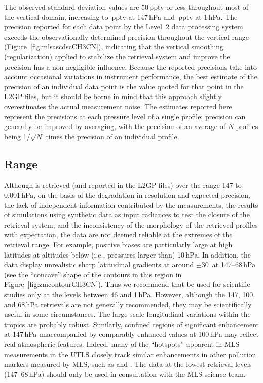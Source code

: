 The observed standard deviation values are 50\,pptv or less throughout most of the vertical domain, increasing to \,pptv at 147\,hPa and \,pptv at 1\,hPa. The precision reported for each data point by the Level~2 data processing system exceeds the observationally determined precision throughout the vertical range (Figure~\ref{fig:mlsascdscCH3CN}), indicating that the vertical smoothing (regularization) applied to stabilize the retrieval system and improve the precision has a non-negligible influence. Because the reported precisions take into account occasional variations in instrument performance, the best estimate of the precision of an individual data point is the value quoted for that point in the L2GP files, but it should be borne in mind that this approach slightly overestimates the actual measurement noise. The estimates reported here represent the precisions at each pressure level of a single profile; precision can generally be improved by averaging, with the precision of an average of $N$ profiles being 1/$\sqrt{N}$ times the precision of an individual profile.

\subsection{Range}

Although  is retrieved (and reported in the L2GP files) over the range 147 to 0.001\,hPa, on the basis of the degradation in resolution and expected precision, the lack of independent information contributed by the measurements, the results of simulations using synthetic data as input radiances to test the closure of the retrieval system, and the inconsistency of the morphology of the retrieved profiles with expectation, the  data are not deemed reliable at the extremes of the retrieval range. For example, positive biases are particularly large at high latitudes at altitudes below (i.e., pressures larger than) 10\,hPa.  In addition, the data display unrealistic sharp latitudinal gradients at around $\pm$30\degsym\ at 147--68\,hPa (see the ``concave'' shape of the contours in this region in Figure~\ref{fig:zmcontourCH3CN}). Thus we recommend that \thisv {} be used for scientific studies only at the levels between 46 and 1\,hPa. However, although the 147, 100, and 68\,hPa retrievals are not generally recommended, they may be scientifically useful in some circumstances. The large-scale longitudinal variations within the tropics are probably robust. Similarly, confined regions of significant enhancement at 147\,hPa unaccompanied by comparably enhanced values at 100\,hPa may reflect real atmospheric features. Indeed, many of the ``hotspots'' apparent in MLS  measurements in the UTLS closely track similar enhancements in other pollution markers measured by MLS, such as  and . The \thisv {} data at the lowest retrieval levels (147--68\,hPa) should only be used in consultation with the MLS science team.

